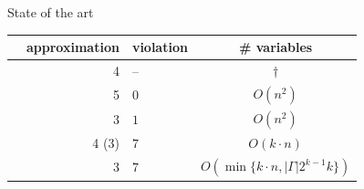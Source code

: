 \documentclass{beamer}
\renewcommand{\epsilon}{\varepsilon}
\begin{document}
\begin{frame}{State of the art}

	\centering
	{\footnotesize
		\begin{tabular}{l r l c}
			\toprule
			                                        & approximation & violation & \# variables                              \\
			\midrule
			\cite{DBLP:conf/nips/Chierichetti0LV17} & 4             & --        & $\dagger$                                 \\
			\cite{DBLP:conf/approx/Bercea0KKRS019}  & 5             & 0         & $O(n^2)$                                  \\
			                                        & 3             & $1$       & $O(n^2)$                                  \\
			\cite{DBLP:conf/nips/BeraCFN19}         & 4 (3)         & $7$       & $O(k\cdot n)$                             \\
			\cite{DBLP:conf/nips/HarbL20}           & 3             & $7$       & $O(\min\{k\cdot n, |\Gamma| 2^{k-1} k\})$ \\
			\bottomrule
		\end{tabular}
	}

\end{frame}
\end{document}
